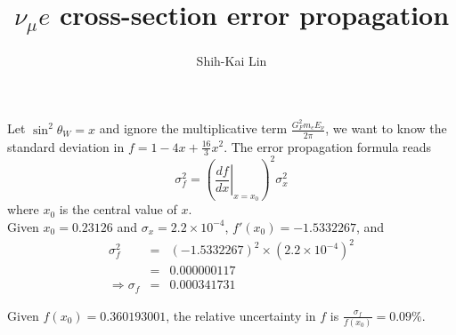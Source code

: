 \documentclass{beamer}
\author{Shih-Kai Lin}
\date{}
\title{\texorpdfstring{$\nu_\mu e$}{nu-e} cross-section error propagation}
\begin{document}
\begin{frame}
\titlepage
\end{frame}
\begin{frame}[allowframebreaks]{}
\scriptsize
Let $\sin^2\theta_W=x$ and ignore the multiplicative term $\frac{G_F^2m_eE_\nu}{2\pi}$, we want to know the standard deviation in $f=1-4x+\frac{16}{3}x^2$. The error propagation formula reads
\begin{equation}
  \sigma_f^2=\left(\left.\frac{df}{dx}\right\vert_{x=x_0}\right)^2\sigma_x^2
\end{equation}
where $x_0$ is the central value of $x$. \\
Given $x_0=0.23126$ and $\sigma_x=2.2\times10^{-4}$, $f'(x_0)=-1.5332267$, and
\begin{eqnarray*}
  \sigma_f^2&=&(-1.5332267)^2\times(2.2\times10^{-4})^2 \\
  &=&0.000000117 \\
  \Rightarrow \sigma_f &=& 0.000341731
\end{eqnarray*}

Given $f(x_0)=0.360193001$, the relative uncertainty in $f$ is $\frac{\sigma_f}{f(x_0)}=0.09\%$.

\end{frame}
\end{document}
